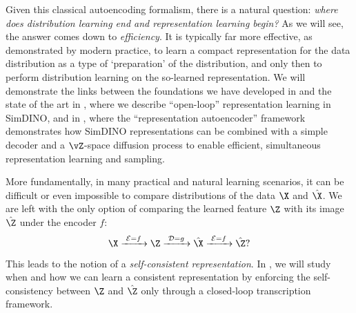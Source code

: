 \documentclass[../../book-main.tex]{subfiles}
\begin{document}
Given this classical autoencoding formalism, there is a natural question:
\textit{where does distribution learning end and representation learning begin?}
As we will see, the answer %
comes down to \textit{efficiency}. It is typically far more
effective, as demonstrated by modern practice, to learn a compact representation
for the data distribution as a type of `preparation' of the distribution,
and only then to perform distribution learning on the so-learned representation.
We will demonstrate the links between the foundations we have developed in
 and the state of
the art in , where we describe ``open-loop'' representation learning
in SimDINO, and in , where the ``representation autoencoder''
framework demonstrates how SimDINO representations can be combined with
a simple decoder and a $\vZ$-space diffusion process to enable efficient,
simultaneous representation learning and sampling.

More fundamentally, in many practical and natural learning scenarios, it can be difficult or even impossible to compare distributions of the data $\X$ and $\hat \X$. We are left with the only option of comparing the learned feature $\Z$ with its image $\hat \Z$ under the encoder $f$: 
\begin{equation}
 \X
\xrightarrow{\hspace{1mm} \mathcal{E} = f \hspace{1mm}} \Z  \xrightarrow{\hspace{1mm} \mathcal{D} = g \hspace{1mm}} \hat{\X} \xrightarrow{\hspace{1mm} \mathcal{E} = f \hspace{1mm}} \hat \Z?
\end{equation}
This leads to the notion of a {\em self-consistent representation}. In , we will study when and how we can learn a consistent representation by enforcing the self-consistency between $\Z$ and $\hat \Z$ only through a closed-loop transcription framework. 
\end{document}
